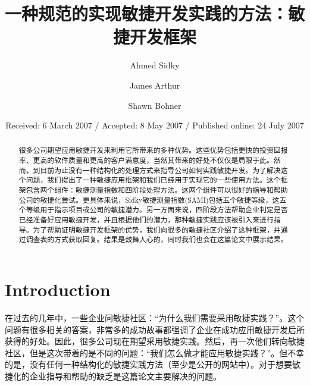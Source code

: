 \documentclass[twocolumn]{svjour3}[]
\begin{document}
\renewcommand{\arraystretch}{1.5}

\title{一种规范的实现敏捷开发实践的方法：敏捷开发框架}

\author{Ahmed Sidky \and James Arthur \and Shawn Bohner}


\date{Received: 6 March 2007 / Accepted: 8 May 2007 / Published online: 24 July 2007}

\maketitle

\begin{abstract}
很多公司期望应用敏捷开发来利用它所带来的多种优势。这些优势包括更快的投资回报率、更高的软件质量和更高的客户满意度，当然其带来的好处不仅仅是局限于此。然而，到目前为止没有一种结构化的处理方式来指导公司如何实践敏捷开发。为了解决这个问题，我们提出了一种敏捷应用框架和我们已经用于实现它的一些使用方法。这个框架包含两个组件：敏捷测量指数和四阶段处理方法。这两个组件可以很好的指导和帮助公司的敏捷化尝试。更具体来说，Sidky敏捷测量指数(SAMI)包括五个敏捷等级，这五个等级用于指示项目或公司的敏捷潜力。另一方面来说，四阶段方法帮助企业判定是否已经准备好应用敏捷开发，并且根据他们的潜力，那种敏捷实践应该被引入来进行指导。为了帮助证明敏捷开发框架的优势，我们向很多的敏捷社区介绍了这种框架，并通过调查表的方式获取回复。结果是鼓舞人心的，同时我们也会在这篇论文中展示结果。
\end{abstract}

\section{Introduction}
\label{intro}
在过去的几年中，一些企业问敏捷社区：“为什么我们需要采用敏捷实践？”\cite{highsmith2006agile}。这个问题有很多相关的答案，非常多的成功故事都强调了企业在成功应用敏捷开发后所获得的好处\cite{barnett2006agile,barnett2004adopting,kuppuswami2003effects,law2005effects,schatz2005primavera,williams2000strengthening}。因此，很多公司现在期望采用敏捷实践。然后，再一次他们转向敏捷社区，但是这次带着的是不同的问题：“我们怎么做才能应用敏捷实践？”\cite{highsmith2006agile}。但不幸的是，没有任何一种结构化的敏捷实践方法（至少是公开的网站中）。对于想要敏捷化的企业指导和帮助的缺乏是这篇论文主要解决的问题。
\end{document}
